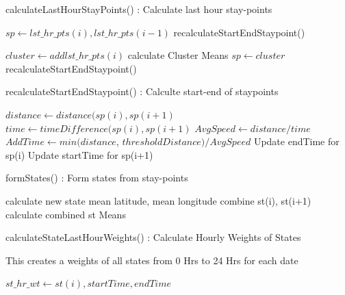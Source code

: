\documentclass{article}
\begin{document}
\begin{algorithm}
\caption{calculateLastHourStayPoints() : Calculate last hour stay-points}
\label{pseudoPSO}
\begin{algorithmic}[1]

	\State$ sp \gets lst\_hr\_pts(i),  lst\_hr\_pts(i-1)$
	\State recalculateStartEndStaypoint()
\EndIf

	\State $cluster \gets add lst\_hr\_pts(i)$ 
	\State calculate Cluster Means
\Else
    	\State $sp \gets cluster$
    	\State recalculateStartEndStaypoint()
	\EndIf
\EndIf

\EndFor
\end{algorithmic}
\end{algorithm}

\begin{algorithm}
\caption{recalculateStartEndStaypoint() : Calculte start-end of staypoints}
\label{pseudoPSO}
\begin{algorithmic}[1]
	\State $distance \gets distance(sp(i), sp(i+1)$
	\State $time \gets timeDifference(sp(i), sp(i+1)$
	\State $AvgSpeed \gets distance/time$
	\State $AddTime \gets min(distance$, $thresholdDistance)/AvgSpeed$
	\State Update endTime for sp(i)
	\State Update startTime for sp(i+1)
\EndFor
\end{algorithmic}
\end{algorithm}


\begin{algorithm}
\caption{formStates() : Form states from stay-points}
\label{pseudoPSO}
\begin{algorithmic}[1]

	\State calculate new state mean latitude, mean longitude
	\State combine st(i), st(i+1)
	\State calculate combined st Means
	\EndIf
\EndIf
\EndFor
\end{algorithmic}
\end{algorithm}

\begin{algorithm}
\caption{calculateStateLastHourWeights() : Calculate Hourly Weights of States}
\label{pseudoPSO}
\begin{algorithmic}[1]
\State This creates a weights of all states from 0 Hrs to 24 Hrs for each date

	\State $st\_hr\_wt \gets st(i), startTime, endTime$
\EndIf
\EndFor
\end{algorithmic}
\end{algorithm}
\end{document}
